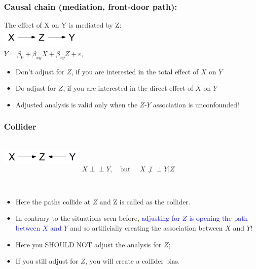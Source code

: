 \documentclass[10pt,dvipsnames,t,handout%
,aspectratio=169%
]{beamer}%
\newcommand{\indep}{\perp\!\!\!\!\perp}
\newcommand{\sini}[1]{\textcolor{Blue}{#1}}
\newcommand{\puna}[1]{\textcolor{BrickRed}{#1}}
\begin{document}
\begin{frame}
	\frametitle{Causal chain (mediation, front-door path):}
	The effect of X on Y is \alert{mediated} by  Z:   \\[0.5cm]
	\includegraphics[width=4cm]{chain}\\[0.5cm]
	
	$Y = \beta_0 +  \beta_{xy} X + \beta_{zy} Z + \varepsilon $, \\[0.3cm]
	
	\pause
	\begin{itemize}
		\item 
	\alert{Don't adjust for $Z$},  if you are interested in the \alert{total effect} of $X$ on $Y$  
\item \alert{Do adjust for $Z$},  if you are interested in the \alert{direct effect} of $X$ on $Y$ 
\item Adjusted analysis is valid only when the $Z$-$Y$ association is unconfounded! 
\end{itemize}
	

\end{frame}



\begin{frame}
	\frametitle{Collider}
	\mbox{ }\\
	\includegraphics[width=4cm]{collider}\\[0.3cm]
	$$X \indep Y, \quad \text{but } \quad  
	X \not\indep Y|Z$$
	
	\begin{block}{ }\mbox{ }\\
				\begin{itemize}
			\item Here the paths \puna{collide} at $Z$ and Z is called as the \puna{collider}.
			\item In contrary to the situations seen before, \sini{adjusting for $Z$ is  opening the path between $X$ and $Y$} and so 
			 artificially creating the association between $X$ and $Y$!
	\item Here you \puna{SHOULD NOT} adjust the analysis for $Z$;
	\item If you still adjust for $Z$, you will create a \puna{collider bias}.
			\end{itemize}
		\end{block}
\end{frame}
\end{document}
